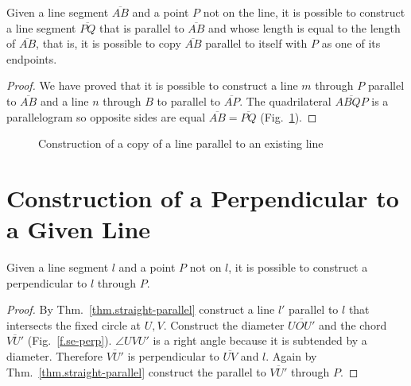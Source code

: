 \begin{theorem}
Given a line segment $\overline{AB}$ and a point $P$ not on the line, it is possible to construct a line segment $\overline{PQ}$ that is parallel to $\overline{AB}$ and whose length is equal to the length of $\overline{AB}$, that is, it is possible to copy $\overline{AB}$ parallel to itself with $P$ as one of its endpoints.
\end{theorem}

\begin{proof}
We have proved that it is possible to construct a line $m$ through $P$ parallel to $\overline{AB}$ and a line $n$ through $B$ to parallel to $\overline{AP}$. The quadrilateral $\overline{ABQP}$ is a parallelogram so opposite sides are equal $\overline{AB}=\overline{PQ}$ (Fig.~\ref{f.se-parallel-other4}).
\end{proof}

\begin{figure}[t]
\begin{center}
\end{center}
\caption{Construction of  a copy of a line parallel to an existing line}\label{f.se-parallel-other4}
\end{figure}

\section{Construction of a Perpendicular to a Given Line}\label{s.perp}

\begin{theorem}\label{thm.straight-perp}
Given a line segment $l$ and a point $P$ not on $l$, it is possible to construct a perpendicular to $l$ through $P$.
\end{theorem}

\begin{proof}
By Thm.~\ref{thm.straight-parallel} construct a line $l'$ parallel to $l$ that intersects the fixed circle at $U,V$. Construct the diameter $\overline{UOU'}$ and the chord $\overline{VU'}$ (Fig.~\ref{f.se-perp}). $\angle UVU'$ is a right angle because it is subtended by a diameter. Therefore $\overline{VU'}$ is perpendicular to $\overline{UV}$ and $l$. Again by Thm.~\ref{thm.straight-parallel} construct the parallel to $\overline{VU'}$ through $P$.
\end{proof}

